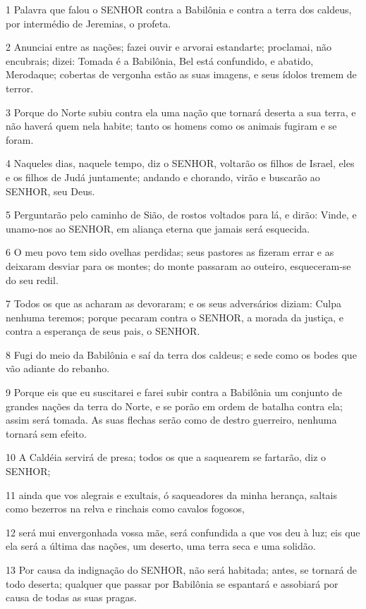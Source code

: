 \par 1 Palavra que falou o SENHOR contra a Babilônia e contra a terra dos caldeus, por intermédio de Jeremias, o profeta.
\par 2 Anunciai entre as nações; fazei ouvir e arvorai estandarte; proclamai, não encubrais; dizei: Tomada é a Babilônia, Bel está confundido, e abatido, Merodaque; cobertas de vergonha estão as suas imagens, e seus ídolos tremem de terror.
\par 3 Porque do Norte subiu contra ela uma nação que tornará deserta a sua terra, e não haverá quem nela habite; tanto os homens como os animais fugiram e se foram.
\par 4 Naqueles dias, naquele tempo, diz o SENHOR, voltarão os filhos de Israel, eles e os filhos de Judá juntamente; andando e chorando, virão e buscarão ao SENHOR, seu Deus.
\par 5 Perguntarão pelo caminho de Sião, de rostos voltados para lá, e dirão: Vinde, e unamo-nos ao SENHOR, em aliança eterna que jamais será esquecida.
\par 6 O meu povo tem sido ovelhas perdidas; seus pastores as fizeram errar e as deixaram desviar para os montes; do monte passaram ao outeiro, esqueceram-se do seu redil.
\par 7 Todos os que as acharam as devoraram; e os seus adversários diziam: Culpa nenhuma teremos; porque pecaram contra o SENHOR, a morada da justiça, e contra a esperança de seus pais, o SENHOR.
\par 8 Fugi do meio da Babilônia e saí da terra dos caldeus; e sede como os bodes que vão adiante do rebanho.
\par 9 Porque eis que eu suscitarei e farei subir contra a Babilônia um conjunto de grandes nações da terra do Norte, e se porão em ordem de batalha contra ela; assim será tomada. As suas flechas serão como de destro guerreiro, nenhuma tornará sem efeito.
\par 10 A Caldéia servirá de presa; todos os que a saquearem se fartarão, diz o SENHOR;
\par 11 ainda que vos alegrais e exultais, ó saqueadores da minha herança, saltais como bezerros na relva e rinchais como cavalos fogosos,
\par 12 será mui envergonhada vossa mãe, será confundida a que vos deu à luz; eis que ela será a última das nações, um deserto, uma terra seca e uma solidão.
\par 13 Por causa da indignação do SENHOR, não será habitada; antes, se tornará de todo deserta; qualquer que passar por Babilônia se espantará e assobiará por causa de todas as suas pragas.
